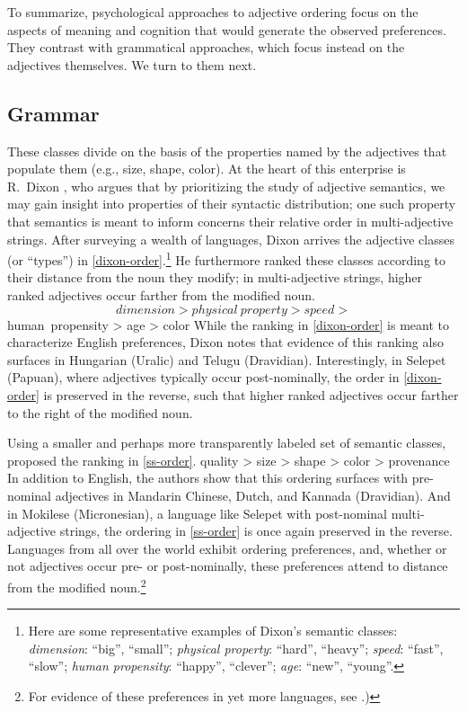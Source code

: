 \documentclass{pnastwo}
\begin{document}
\begin{article}
To summarize, psychological approaches to adjective ordering focus on the aspects of meaning and cognition that would generate the observed preferences. They contrast with grammatical approaches, which focus instead on the adjectives themselves. We turn to them next.

\subsection{Grammar}
 These classes divide on the basis of the properties named by the adjectives that populate them (e.g., size, shape, color). At the heart of this enterprise is R.~Dixon \cite{dixon1982}, who argues that by prioritizing the study of adjective semantics, we may gain insight into properties of their syntactic distribution; one such property that semantics is meant to inform concerns their relative order in multi-adjective strings. After surveying a wealth of languages, Dixon arrives the adjective classes (or ``types'') in \ref{dixon-order}.\footnote{Here are some representative examples of Dixon's semantic classes:\\ \textit{dimension}: ``big'', ``small''; \textit{physical property}: ``hard'', ``heavy''; \textit{speed}: ``fast'', ``slow''; \textit{human propensity}: ``happy'', ``clever''; \textit{age}: ``new'', ``young''.} He furthermore ranked these classes according to their distance from the noun they modify; in multi-adjective strings, higher ranked adjectives occur farther from the modified noun.
\[
dimension > physical\ property > speed > 
\]
\be human\ propensity > age > color\label{dixon-order}\ee
While the ranking in \ref{dixon-order} is meant to characterize English preferences, Dixon notes that evidence of this ranking also surfaces in Hungarian (Uralic) and Telugu (Dravidian). Interestingly, in Selepet (Papuan), where adjectives typically occur post-nominally, the order in \ref{dixon-order} is preserved in the reverse, such that higher ranked adjectives occur farther to the right of the modified noun. 

Using a smaller and perhaps more transparently labeled set of semantic classes, \cite{sproatshih1991} proposed the ranking in \ref{ss-order}.
\be quality > size > shape > color > provenance\label{ss-order}\ee
In addition to English, the authors show that this ordering surfaces with pre-nominal adjectives in Mandarin Chinese, Dutch, and Kannada (Dravidian). And in Mokilese (Micronesian), a language like Selepet with post-nominal multi-adjective strings, the ordering in \ref{ss-order} is once again preserved in the reverse. Languages from all over the world exhibit ordering preferences, and, whether or not adjectives occur pre- or post-nominally, these preferences attend to distance from the modified noun.\footnote{For evidence of these preferences in yet more languages, see \cite{martin1969competence,hetzron1978,lapollahuang2004}.)}


\end{article}
\end{document}
